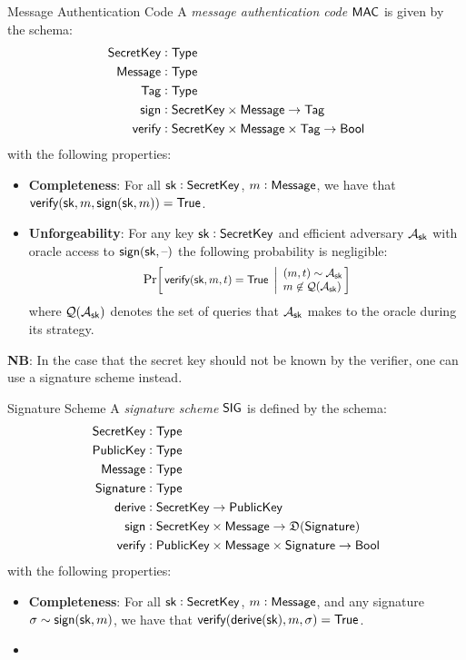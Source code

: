 \begin{definitiontoc}{Message Authentication Code}
    A \emph{message authentication code} ${\textsf{MAC}}$ is given by the schema:
    \begin{align*}
        {\textsf{SecretKey}} &: {\textsf{Type}} \\
        {\textsf{Message}}   &: {\textsf{Type}} \\
        {\textsf{Tag}}       &: {\textsf{Type}} \\
        {\textsf{sign}}      &: {\textsf{SecretKey}} \times {\textsf{Message}} \to {\textsf{Tag}} \\
        {\textsf{verify}}    &: {\textsf{SecretKey}} \times {\textsf{Message}} \times {\textsf{Tag}} \to {\textsf{Bool}}
    \end{align*}
    with the following properties:
    \begin{itemize}
        \item \textbf{Completeness}: For all ${\textsf{sk}} : {\textsf{SecretKey}}$, $m : {\textsf{Message}}$, we have that ${\textsf{verify}}({\textsf{sk}}, m, {\textsf{sign}}({\textsf{sk}}, m)) = {\textsf{True}}$.
        \item \textbf{Unforgeability}: For any key ${\textsf{sk}} : {\textsf{SecretKey}}$ and efficient adversary $\mathcal{A}_{\textsf{sk}}$ with oracle access to ${\textsf{sign}}({\textsf{sk}}, {\textrm{--}})$ the following probability is negligible:
            \[
                \Prob{
                    \verify(\sk, m, t) = \True
                }{
                    (m, t) \sim \mathcal{A}_\sk \\
                    m \not\in \mathcal{Q}(\mathcal{A}_\sk)
                }
            \]
            where $\mathcal{Q}(\mathcal{A}_{\textsf{sk}})$ denotes the set of queries that $\mathcal{A}_{\textsf{sk}}$ makes to the oracle during its strategy.
    \end{itemize}

    \textbf{NB}: In the case that the secret key should not be known by the verifier, one can use a signature scheme instead.
\end{definitiontoc}

\begin{definitiontoc}{Signature Scheme}
    A \emph{signature scheme} ${\textsf{SIG}}$ is defined by the schema:
    \begin{align*}
        {\textsf{SecretKey}}    &: {\textsf{Type}} \\
        {\textsf{PublicKey}}    &: {\textsf{Type}} \\
        {\textsf{Message}}      &: {\textsf{Type}} \\
        {\textsf{Signature}}    &: {\textsf{Type}} \\
        {\textsf{derive}}       &: {\textsf{SecretKey}} \to {\textsf{PublicKey}} \\
        {\textsf{sign}}         &: {\textsf{SecretKey}} \times {\textsf{Message}} \to \mathfrak{D}({\textsf{Signature}}) \\
        {\textsf{verify}}       &: {\textsf{PublicKey}} \times {\textsf{Message}} \times {\textsf{Signature}} \to {\textsf{Bool}}
    \end{align*}
    with the following properties:
    \begin{itemize}
        \item \textbf{Completeness}: For all ${\textsf{sk}} : {\textsf{SecretKey}}$, $m : {\textsf{Message}}$, and any signature $\sigma \sim {\textsf{sign}}({\textsf{sk}}, m)$, we have that ${\textsf{verify}}({\textsf{derive}}({\textsf{sk}}), m, \sigma) = {\textsf{True}}$.
        \item {}
    \end{itemize}
\end{definitiontoc}

